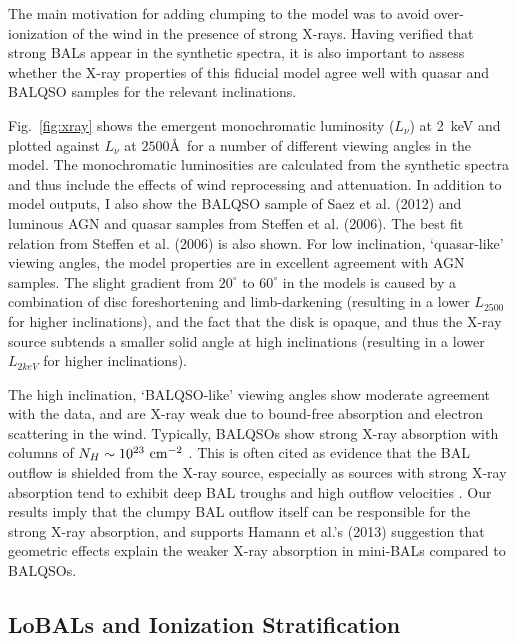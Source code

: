 The main motivation for adding clumping to the model was
to avoid over-ionization of the wind in the presence of strong X-rays. 
Having verified that strong BALs appear in the synthetic spectra,
it is also important to assess whether the X-ray properties of this
fiducial model agree well with quasar and BALQSO samples for the relevant
inclinations.

Fig.~\ref{fig:xray} shows the emergent
monochromatic luminosity ($L_\nu$) at 2~keV and 
plotted against $L_\nu$ at $2500$\AA\ for a number of different viewing angles in the model.
The monochromatic luminosities are calculated from the synthetic spectra and thus include
the effects of wind reprocessing and attenuation. In addition to model outputs,
I also show the BALQSO sample of Saez et al. (2012) and luminous AGN and quasar
samples from Steffen et al. (2006). The best fit relation from Steffen et al. (2006) 
is also shown. For low inclination, `quasar-like' viewing angles,
the model properties are in excellent agreement with AGN samples. The slight gradient from $20^\circ$ to
$60^\circ$ in the models is caused by a combination of disc foreshortening and limb-darkening 
(resulting in a lower $L_{2500}$ for higher inclinations), and the fact that the disk 
is opaque, and thus the X-ray source subtends a smaller solid angle at high inclinations
(resulting in a lower $L_{2keV}$ for higher inclinations). 


The high inclination, `BALQSO-like' viewing angles show moderate agreement with the data,
and are X-ray weak due to bound-free absorption and electron scattering in the wind.
Typically, BALQSOs show strong X-ray absorption with columns 
of $N_H\sim10^{23}~\rm{cm^{-2}}$ 
\citep{green1996,mathur2000,green2001,grupemathur2003}.
This is often cited as evidence that the BAL outflow is shielded from
the X-ray source, especially as sources with strong X-ray absorption tend
to exhibit deep BAL troughs and high outflow velocities 
\citep{brandt2000,laorbrandt2002,gallagher2006}.
Our results imply that the clumpy BAL outflow
itself can be responsible for the strong X-ray absorption, 
and supports Hamann et al.'s (2013) suggestion that 
geometric effects explain the weaker X-ray absorption in mini-BALs 
compared to BALQSOs.

\subsection{LoBALs and Ionization Stratification}

